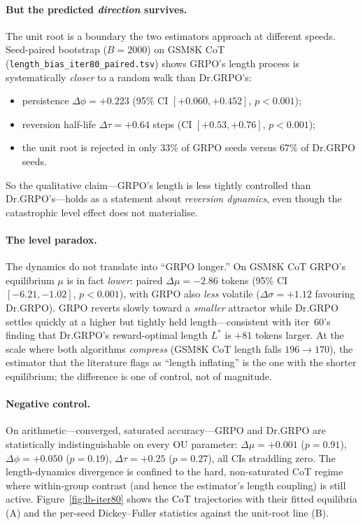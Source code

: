 \documentclass{article}
\begin{document}
\paragraph{But the predicted \emph{direction} survives.}
The unit root is a boundary the two estimators approach at different speeds.
Seed-paired bootstrap ($B=2000$) on GSM8K CoT
(\texttt{length\_bias\_iter80\_paired.tsv}) shows GRPO's length process is
systematically \emph{closer} to a random walk than Dr.GRPO's:
\begin{itemize}
\item persistence $\Delta\phi = +0.223$ (95\% CI $[+0.060,+0.452]$, $p<0.001$);
\item reversion half-life $\Delta\tau = +0.64$ steps (CI $[+0.53,+0.76]$, $p<0.001$);
\item the unit root is rejected in only $33\%$ of GRPO seeds versus $67\%$ of Dr.GRPO seeds.
\end{itemize}
So the qualitative claim---GRPO's length is less tightly controlled than
Dr.GRPO's---holds as a statement about \emph{reversion dynamics}, even
though the catastrophic level effect does not materialise.

\paragraph{The level paradox.}
The dynamics do not translate into ``GRPO longer.'' On GSM8K CoT GRPO's
equilibrium $\mu$ is in fact \emph{lower}: paired
$\Delta\mu = -2.86$ tokens (95\% CI $[-6.21,-1.02]$, $p<0.001$), with GRPO
also \emph{less} volatile ($\Delta\sigma=+1.12$ favouring Dr.GRPO). GRPO
reverts slowly toward a \emph{smaller} attractor while Dr.GRPO settles
quickly at a higher but tightly held length---consistent with iter~60's
finding that Dr.GRPO's reward-optimal length $L^\ast$ is $+81$ tokens larger.
At the scale where both algorithms \emph{compress} (GSM8K CoT length falls
$196\!\to\!170$), the estimator that the literature flags as ``length
inflating'' is the one with the shorter equilibrium; the difference is one
of control, not of magnitude.

\paragraph{Negative control.}
On arithmetic---converged, saturated accuracy---GRPO and Dr.GRPO are
statistically indistinguishable on every OU parameter: $\Delta\mu=+0.001$
($p=0.91$), $\Delta\phi=+0.050$ ($p=0.19$), $\Delta\tau=+0.25$ ($p=0.27$),
all CIs straddling zero. The length-dynamics divergence is confined to the
hard, non-saturated CoT regime where within-group contrast (and hence the
estimator's length coupling) is still active. Figure~\ref{fig:lb-iter80}
shows the CoT trajectories with their fitted equilibria (A) and the
per-seed Dickey--Fuller statistics against the unit-root line (B).
\end{document}
